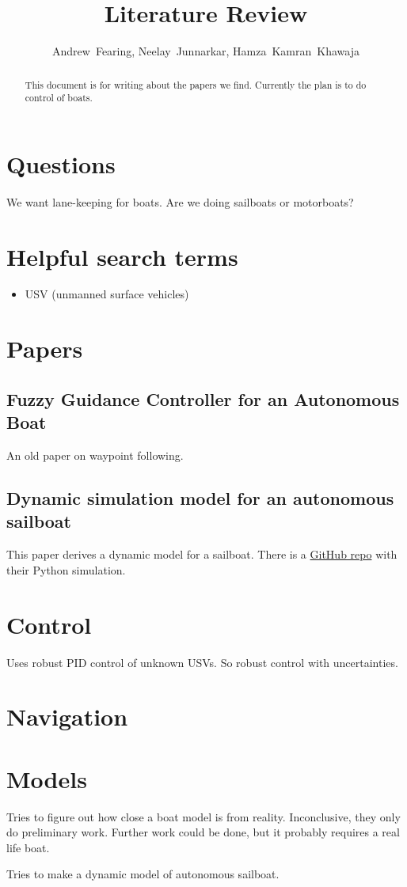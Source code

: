 \documentclass[conference]{IEEEtran}
\begin{document}
\title{Literature Review}
\author{Andrew~Fearing, Neelay~Junnarkar,  Hamza~Kamran~Khawaja}
\maketitle

\begin{abstract}
This document is for writing about the papers we find. Currently the plan is to do control of boats.
\end{abstract}

\section{Questions}
We want lane-keeping for boats. Are we doing sailboats or motorboats?
\section{Helpful search terms}
\begin{itemize}
    \item USV (unmanned surface vehicles)
    
\end{itemize}

\section{Papers}
\subsection{Fuzzy Guidance Controller for an Autonomous Boat}
\cite{Vaneck1997} An old paper on waypoint following.


\subsection{Dynamic simulation model for an autonomous sailboat}
\cite{Buehler2018} This paper derives a dynamic model for a sailboat. There is a \href{https://github.com/simonkohaut/stda-sailboat-simulator/tree/master/src}{GitHub repo} with their Python simulation.


\section{Control}
\cite{Nan2020} Uses robust PID control of unknown USVs. So robust control with uncertainties.
\section{Navigation}

\section{Models}
\cite{Huang2017} Tries to figure out how close a boat model is from reality. Inconclusive, they only do preliminary work. Further work could be done, but it probably requires a real life boat.

\cite{Setiawan2020} Tries to make a dynamic model of autonomous sailboat.


\end{document}

